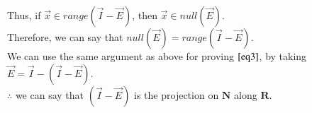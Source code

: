 \documentclass[journal,12pt,twocolumn]{IEEEtran}
\begin{document}
	Thus, if $\vec{x} \in range(\Vec{I} - \Vec{E})$, then $\Vec{x} \in null(\Vec{E})$.\\
	
	Therefore, we can say that $null(\Vec{E}) = range(\Vec{I} - \Vec{E})$. \\
	
	We can use the same argument as above for proving $\eqref{eq3}$, by taking $\Vec{E} = \Vec{I} - (\Vec{I} - \Vec{E})$.\\
	
	$\therefore$ we can say that $(\Vec{I} - \Vec{E})$ is the projection on $\mathbf{N}$ along $\mathbf{R}$.
	
\end{document}
